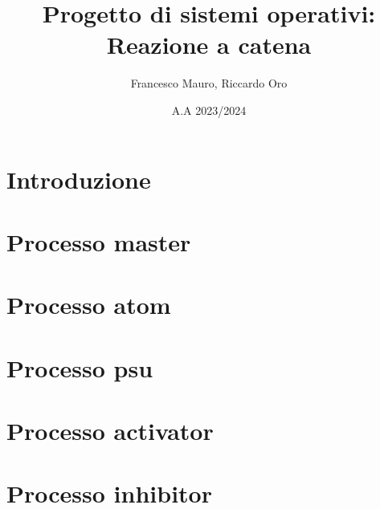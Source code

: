 \documentclass{article}
\title{Progetto di sistemi operativi: Reazione a catena}
\author{Francesco Mauro, Riccardo Oro}
\date{A.A 2023/2024}
\begin{document}
\maketitle
\tableofcontents

\chapter{Introduzione} 

\chapter{Processo master}

\chapter{Processo atom}

\chapter{Processo psu}

\chapter{Processo activator}

\chapter{Processo inhibitor}











\end{document}
